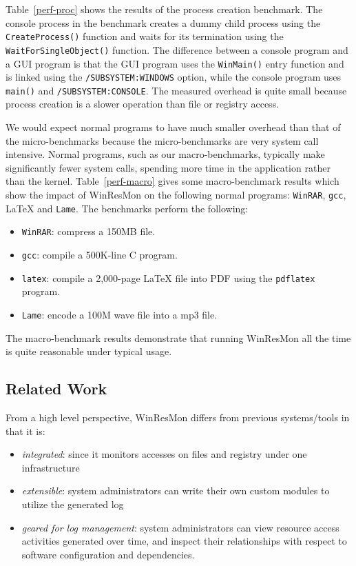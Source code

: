 Table~\ref{perf-proc} shows the results of the process creation benchmark. The
console process in the benchmark creates a dummy child process using the
{\small\tt CreateProcess()} function and waits for its termination using the
{\small\tt WaitForSingleObject()} function.  The difference between a console
program and a GUI program is that the GUI program uses the {\small\tt WinMain()}
entry function and is linked using the {\small\tt /SUBSYSTEM:WINDOWS} option, while
the console program uses {\small\tt main()} and {\small\tt /SUBSYSTEM:CONSOLE}.  The
measured overhead is quite small because process creation is a slower
operation than file or registry access.

We would expect normal programs to have much smaller overhead than that of the
micro-benchmarks because the micro-benchmarks are very system call intensive.
Normal programs, such as our macro-benchmarks, typically make significantly
fewer system calls, spending more time in the application rather than the
kernel.
Table~\ref{perf-macro} gives some macro-benchmark results which show the
impact of WinResMon on the following normal programs: {\small\tt WinRAR}, {\small\tt gcc}, \LaTeX{} and {\small\tt Lame}.
The benchmarks perform the following:
\begin{itemize}
\item {\small\tt WinRAR}: compress a 150MB file.  
\item {\small\tt gcc}: compile a 500K-line C program.  
\item {\small\tt latex}: compile a 2,000-page \LaTeX{} file into PDF using the
{\small\tt pdflatex} program.
\item {\small\tt Lame}: encode a 100M wave file into a mp3 file. 
\end{itemize}
The macro-benchmark results demonstrate that running WinResMon all the 
time  is quite reasonable under typical usage.


\subsection{Related Work}

 From a high level perspective, WinResMon differs from previous systems/tools in
that it is:

\begin{itemize}
\item {\em integrated}: since it monitors accesses on files and registry
under one infrastructure
\item {\em extensible}: system administrators can write their own custom
modules to utilize the generated log
\item {\em geared for log management}: system administrators can view
resource access activities generated over time, and inspect their relationships
with respect to software configuration and dependencies.
\end{itemize}

